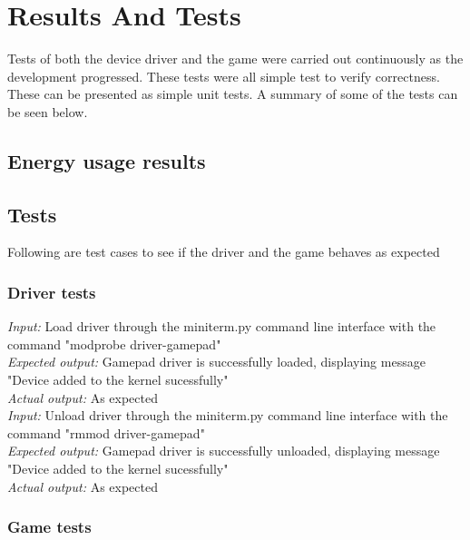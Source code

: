 \section{Results And Tests}
Tests of both the device driver and the game were carried out continuously as the development progressed. These tests were all simple test to verify correctness. These can be presented as simple unit tests. A summary of some of the tests can be seen below.

\subsection{Energy usage results}








\subsection{Tests}

Following are test cases to see if the driver and the game behaves as expected

\subsubsection{Driver tests}

\emph{Input: } Load driver through the miniterm.py command line interface with the command "modprobe driver-gamepad"\\
\emph{Expected output: } Gamepad driver is successfully loaded, displaying message "Device added to the kernel sucessfully"\\
\emph{Actual output: } As expected\\

\emph{Input: } Unload driver through the miniterm.py command line interface with the command "rmmod driver-gamepad"\\
\emph{Expected output: } Gamepad driver is successfully unloaded, displaying message "Device added to the kernel sucessfully"\\
\emph{Actual output: } As expected\\



\subsubsection{Game tests}

